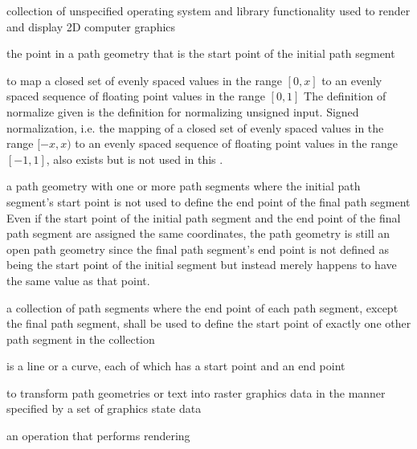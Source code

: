 collection of unspecified operating system and library functionality used to render and display 2D computer graphics

the point in a path geometry that is the start point of the initial path segment

to map a closed set of evenly spaced values in the range $[0, x]$ to an evenly spaced sequence of floating point values in the range $[0, 1]$
\enternote
The definition of normalize given is the definition for normalizing unsigned input. Signed normalization, i.e. the mapping of a closed set of evenly spaced values in the range $[-x, x)$ to an evenly spaced sequence of floating point values in the range $[-1, 1]$, also exists but is not used in this \documenttypename{}.
\exitnote

a path geometry with one or more path segments where the initial path segment's start point is not used to define the end point of the final path segment
\enternote
Even if the start point of the initial path segment and the end point of the final path segment are assigned the same coordinates, the path geometry is still an open path geometry since the final path segment's end point is not defined as being the start point of the initial segment but instead merely happens to have the same value as that point.
\exitnote

a collection of path segments where the end point of each path segment, except the final path segment, shall be used to define the start point of exactly one other path segment in the collection

is a line or a curve, each of which has a start point and an end point

to transform path geometries or text into raster graphics data in the manner specified by a set of graphics state data

an operation that performs rendering

